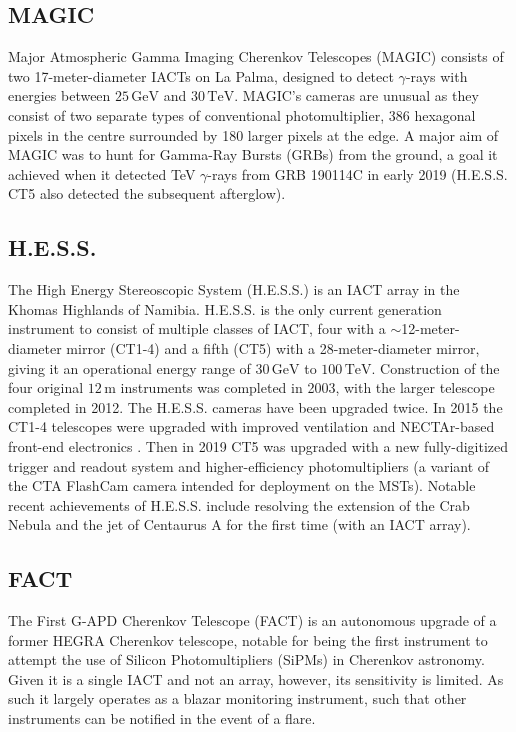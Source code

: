 \subsection{MAGIC}
Major Atmospheric Gamma Imaging Cherenkov Telescopes (MAGIC) consists of two 17-meter-diameter IACTs on La Palma, designed to detect $\gamma$-rays with energies between $\mathrm{25\,GeV}$ and $\mathrm{30\,TeV}$. MAGIC's cameras are unusual as they consist of two separate types of conventional photomultiplier, 386 hexagonal pixels in the centre surrounded by 180 larger pixels at the edge. A major aim of MAGIC was to hunt for Gamma-Ray Bursts (GRBs) from the ground, a goal it achieved when it detected TeV $\gamma$-rays from GRB 190114C in early 2019 \cite{magicGRB} (H.E.S.S. CT5 also detected the subsequent afterglow).

\subsection{H.E.S.S.}
The High Energy Stereoscopic System (H.E.S.S.) is an IACT array in the Khomas Highlands of Namibia. H.E.S.S. is the only current generation instrument to consist of multiple classes of IACT, four with a $\sim$12-meter-diameter mirror (CT1-4) and a fifth (CT5) with a 28-meter-diameter mirror, giving it an operational energy range of $\mathrm{30\,GeV}$ to $\mathrm{100\,TeV}$. Construction of the four original $\mathrm{12\,m}$ instruments was completed in 2003, with the larger telescope completed in 2012. The H.E.S.S. cameras have been upgraded twice. In 2015 the CT1-4 telescopes were upgraded with improved ventilation and NECTAr-based front-end electronics \cite{hess1u}. Then in 2019 CT5 was upgraded with a new fully-digitized trigger and readout system and higher-efficiency photomultipliers (a variant of the CTA FlashCam camera intended for deployment on the MSTs). Notable recent achievements of H.E.S.S. include resolving the extension of the Crab Nebula \cite{crabextension} and the jet of Centaurus A \cite{cena} for the first time (with an IACT array).

\subsection{FACT}
The First G-APD Cherenkov Telescope (FACT) is an autonomous upgrade of a former HEGRA Cherenkov telescope, notable for being the first instrument to attempt the use of Silicon Photomultipliers (SiPMs) in Cherenkov astronomy. Given it is a single IACT and not an array, however, its sensitivity is limited. As such it largely operates as a blazar monitoring instrument, such that other instruments can be notified in the event of a flare. 

